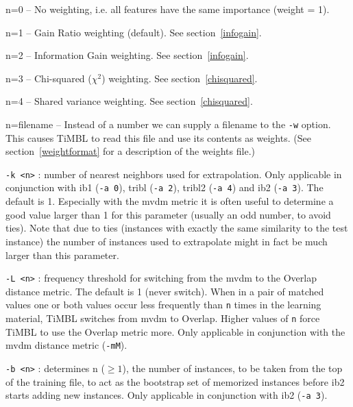 \documentclass{report}
\begin{document}
\begin{description}
	\begin{description}
	\item n=0 -- No weighting, i.e. all features have the same
	importance (weight = 1).
	\item n=1 -- Gain Ratio weighting (default). See section~\ref{infogain}.
	\item n=2 -- Information Gain weighting. See section~\ref{infogain}.
	\item n=3 -- Chi-squared ($\chi^2$) weighting. See section~\ref{chisquared}.
	\item n=4 -- Shared variance weighting. See section~\ref{chisquared}.
	\item n=filename -- Instead of a number we can supply a
	filename to the {\tt -w} option. This causes TiMBL to read this file
	and use its contents as weights. (See section~\ref{weightformat} for a
	description of the weights file.)
	\end{description}

\item {\tt -k <n>} : number of nearest neighbors used for
extrapolation. Only applicable in conjunction with {\sc ib1} ({\tt -a
0}), {\sc tribl} ({\tt -a 2}), {\sc tribl2} ({\tt -a 4}) and {\sc ib2}
({\tt -a 3}). The default is 1. Especially with the {\sc mvdm} metric
it is often useful to determine a good value larger than 1 for this
parameter (usually an odd number, to avoid ties). Note that due to
ties (instances with exactly the same similarity to the test instance)
the number of instances used to extrapolate might in fact be much
larger than this parameter.

\item {\tt -L <n>} : frequency threshold for switching from the {\sc
mvdm} to the Overlap distance metric. The default is 1 (never
switch). When in a pair of matched values one or both values occur
less frequently than {\tt n} times in the learning material, TiMBL
switches from {\sc mvdm} to Overlap. Higher values of {\tt n} force
TiMBL to use the Overlap metric more. Only applicable in conjunction
with the {\sc mvdm} distance metric ({\tt -mM}).

\item {\tt -b <n>} : determines n ($\geq 1$), the number of instances,
to be taken from the top of the training file, to act as the bootstrap
set of memorized instances before {\sc ib2} starts adding new
instances. Only applicable in conjunction with {\sc ib2} ({\tt -a 3}).


\end{description}
\end{document}
